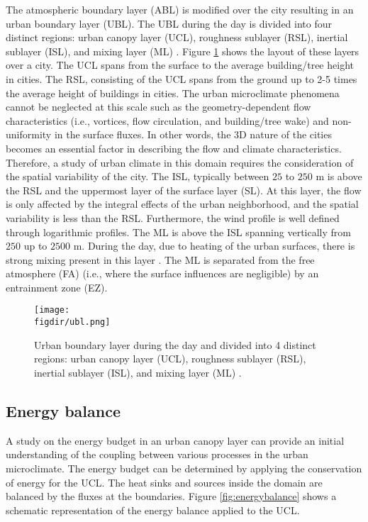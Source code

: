 The atmospheric boundary layer (ABL) is modified over the city resulting in an urban boundary layer (UBL). The UBL during the day is divided into four distinct regions: urban canopy layer (UCL), roughness sublayer (RSL), inertial sublayer (ISL), and mixing layer (ML) \citep{Oke2017a}. Figure \ref{fig:ubl} shows the layout of these layers over a city. The UCL spans from the surface to the average building/tree height in cities. The RSL, consisting of the UCL spans from the ground up to 2-5 times the average height of buildings in cities. The urban microclimate phenomena cannot be neglected at this scale such as the geometry-dependent flow characteristics (i.e., vortices, flow circulation, and building/tree wake) and non-uniformity in the surface fluxes. In other words, the 3D nature of the cities becomes an essential factor in describing the flow and climate characteristics. Therefore, a study of urban climate in this domain requires the consideration of the spatial variability of the city. The ISL, typically between $25$ to $250$ m is above the RSL and the uppermost layer of the surface layer (SL). At this layer, the flow is only affected by the integral effects of the urban neighborhood, and the spatial variability is less than the RSL. Furthermore, the wind profile is well defined through logarithmic profiles. The ML is above the ISL spanning vertically from $250$ up to $2500$ m. During the day, due to heating of the urban surfaces, there is strong mixing present in this layer \citep{Oke2017a}. The ML is separated from the free atmosphere (FA) (i.e., where the surface influences are negligible) by an entrainment zone (EZ).

	\begin{figure}[t]
		\centering
		\texttt{[image: \\figdir/ubl.png]}
		\caption{Urban boundary layer during the day and divided into 4 distinct regions: urban canopy layer (UCL), roughness sublayer (RSL), inertial sublayer (ISL), and mixing layer (ML) \citep{Oke2017a}.}
		\label{fig:ubl}
	\end{figure}

\subsection{Energy balance}
\label{subsec:energybalance}

A study on the energy budget in an urban canopy layer can provide an initial understanding of the coupling between various processes in the urban microclimate. The energy budget can be determined by applying the conservation of energy for the UCL. The heat sinks and sources inside the domain are balanced by the fluxes at the boundaries. Figure \ref{fig:energybalance} shows a schematic representation of the energy balance applied to the UCL. 

